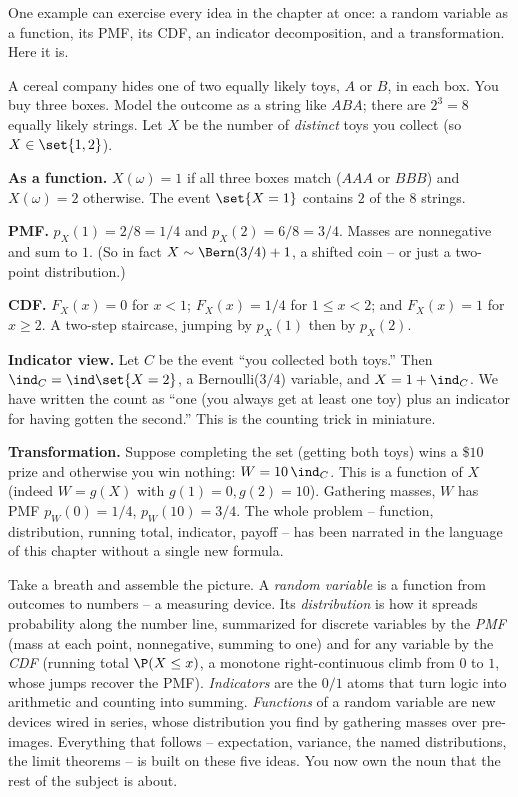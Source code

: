 One example can exercise every idea in the chapter at once: a random variable as a
function, its PMF, its CDF, an indicator decomposition, and a transformation. Here it
is.

\begin{example}
\label{ch06:ex-coupons}
A cereal company hides one of two equally likely toys, $A$ or $B$, in each box. You buy
three boxes. Model the outcome as a string like $ABA$; there are $2^3 = 8$ equally
likely strings. Let $X$ be the number of \emph{distinct} toys you collect (so
$X \in \set{1,2}$).

\textbf{As a function.} $X(\omega) = 1$ if all three boxes match ($AAA$ or $BBB$) and
$X(\omega) = 2$ otherwise. The event $\set{X = 1}$ contains $2$ of the $8$ strings.

\textbf{PMF.} $p_X(1) = 2/8 = 1/4$ and $p_X(2) = 6/8 = 3/4$. Masses are nonnegative and
sum to $1$. (So in fact $X \sim \Bern(3/4) + 1$, a shifted coin -- or just a two-point
distribution.)

\textbf{CDF.} $F_X(x) = 0$ for $x < 1$; $F_X(x) = 1/4$ for $1 \le x < 2$; and
$F_X(x) = 1$ for $x \ge 2$. A two-step staircase, jumping by $p_X(1)$ then by $p_X(2)$.

\textbf{Indicator view.} Let $C$ be the event ``you collected both toys.'' Then
$\ind_C = \ind\set{X = 2}$, a Bernoulli($3/4$) variable, and $X = 1 + \ind_C$. We have
written the count as ``one (you always get at least one toy) plus an indicator for
having gotten the second.'' This is the counting trick in miniature.

\textbf{Transformation.} Suppose completing the set (getting both toys) wins a \$$10$
prize and otherwise you win nothing: $W = 10\,\ind_C$. This is a function of $X$ (indeed
$W = g(X)$ with $g(1) = 0, g(2) = 10$). Gathering masses, $W$ has PMF
$p_W(0) = 1/4$, $p_W(10) = 3/4$. The whole problem -- function, distribution, running
total, indicator, payoff -- has been narrated in the language of this chapter without a
single new formula.
\end{example}

\begin{recoverybox}
Take a breath and assemble the picture. A \emph{random variable} is a function from
outcomes to numbers -- a measuring device. Its \emph{distribution} is how it spreads
probability along the number line, summarized for discrete variables by the \emph{PMF}
(mass at each point, nonnegative, summing to one) and for any variable by the
\emph{CDF} (running total $\P(X \le x)$, a monotone right-continuous climb from $0$ to
$1$, whose jumps recover the PMF). \emph{Indicators} are the $0/1$ atoms that turn logic
into arithmetic and counting into summing. \emph{Functions} of a random variable are
new devices wired in series, whose distribution you find by gathering masses over
pre-images. Everything that follows -- expectation, variance, the named distributions,
the limit theorems -- is built on these five ideas. You now own the noun that the rest
of the subject is about.
\end{recoverybox}

